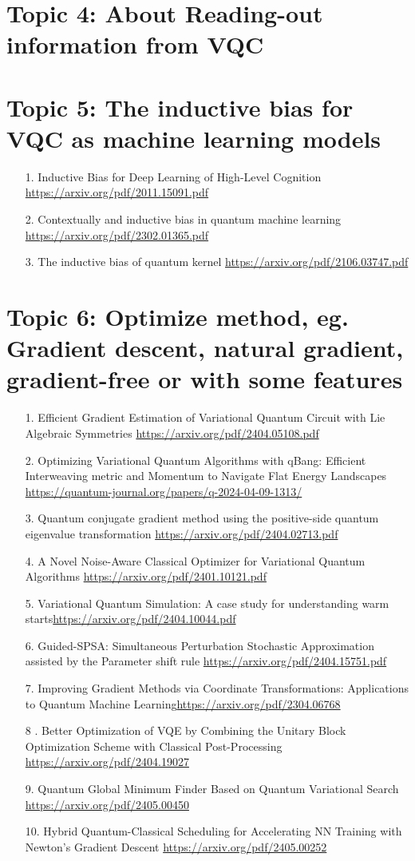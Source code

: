 \documentclass[12pt, oneside]{article}   	%
\begin{document}
\section{Topic 4: About Reading-out information  from VQC}

\section{Topic 5: The inductive bias for VQC as machine learning models}
\begin{itemize}
\item[1. ] Inductive Bias for Deep Learning of High-Level Cognition \url{https://arxiv.org/pdf/2011.15091.pdf}
\item[2. ] Contextually and inductive bias in quantum machine learning \url{https://arxiv.org/pdf/2302.01365.pdf}
\item[3. ] The inductive bias of quantum kernel \url{https://arxiv.org/pdf/2106.03747.pdf}
\end{itemize}

\section{Topic 6: Optimize method, eg. Gradient descent, natural gradient, gradient-free or with some features}
\begin{itemize}
\item[1. ] Efficient Gradient Estimation of Variational Quantum Circuit with Lie Algebraic Symmetries \url{https://arxiv.org/pdf/2404.05108.pdf}
\item[2. ] Optimizing Variational Quantum Algorithms with qBang: Efficient Interweaving metric and Momentum to Navigate Flat Energy Landscapes \url{https://quantum-journal.org/papers/q-2024-04-09-1313/}
\item[3. ] Quantum conjugate gradient method using the positive-side quantum eigenvalue transformation \url{https://arxiv.org/pdf/2404.02713.pdf}
\item [4. ] A Novel Noise-Aware Classical Optimizer for Variational Quantum Algorithms \url{https://arxiv.org/pdf/2401.10121.pdf}
\item[5. ] Variational Quantum Simulation: A case study for understanding warm starts\url{https://arxiv.org/pdf/2404.10044.pdf}
\item[6. ] Guided-SPSA: Simultaneous Perturbation Stochastic Approximation assisted by the Parameter shift rule \url{https://arxiv.org/pdf/2404.15751.pdf}
\item[7. ] Improving Gradient Methods via Coordinate Transformations: Applications to Quantum Machine Learning\url{https://arxiv.org/pdf/2304.06768}
\item[8 .] Better Optimization of VQE by Combining the Unitary Block Optimization Scheme with Classical Post-Processing \url{https://arxiv.org/pdf/2404.19027} 
\item[9. ] Quantum Global Minimum Finder Based on Quantum Variational Search \url{https://arxiv.org/pdf/2405.00450} 
\item[10. ] Hybrid Quantum-Classical Scheduling for Accelerating NN Training with Newton's Gradient Descent \url{https://arxiv.org/pdf/2405.00252}
\end{itemize}
\end{document}
